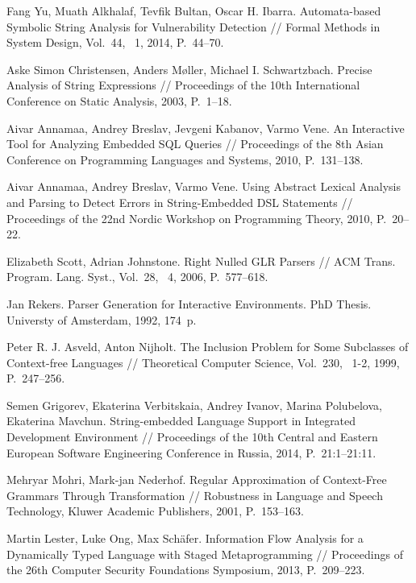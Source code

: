 \documentclass{llncs}
\begin{document}
%
%
\begin{thebibliography}{}
%
Fang Yu, Muath Alkhalaf, Tevfik Bultan, Oscar H. Ibarra.
Automata-based Symbolic String Analysis for Vulnerability Detection //
Formal Methods in System Design, Vol.~44, \textnumero~1, 2014, P.~44--70.

Aske Simon Christensen, Anders M{\o}ller, Michael I. Schwartzbach.
Precise Analysis of String Expressions //
Proceedings of the 10th International Conference on Static Analysis, 2003, P.~1--18.

Aivar Annamaa, Andrey Breslav, Jevgeni Kabanov, Varmo Vene.
An Interactive Tool for Analyzing Embedded SQL Queries //
Proceedings of the 8th Asian Conference on Programming Languages and Systems, 2010, P.~131--138.

Aivar Annamaa, Andrey Breslav, Varmo Vene. Using Abstract Lexical Analysis and Parsing to Detect 
Errors in String-Embedded DSL Statements // 
Proceedings of the 22nd Nordic Workshop on Programming Theory, 2010, P.~20--22. 

Elizabeth Scott, Adrian Johnstone.
Right Nulled GLR Parsers // ACM Trans. Program. Lang. Syst., Vol.~28, \textnumero~4,
2006, P.~577--618.

Jan Rekers.
Parser Generation for Interactive Environments. PhD Thesis. Universty of Amsterdam, 1992, 174~p.

Peter R. J. Asveld, Anton Nijholt.
The Inclusion Problem for Some Subclasses of Context-free Languages //
Theoretical Computer Science, Vol.~230, \textnumero~1-2, 1999, P.~247--256.

Semen Grigorev, Ekaterina Verbitskaia, Andrey Ivanov, Marina Polubelova, Ekaterina Mavchun.
String-embedded Language Support in Integrated Development Environment //
Proceedings of the 10th Central and Eastern European Software Engineering Conference in Russia, 2014, P.~21:1--21:11.

Mehryar Mohri, Mark-jan Nederhof.
Regular Approximation of Context-Free Grammars Through Transformation //
Robustness in Language and Speech Technology, Kluwer Academic Publishers, 2001, P.~153--163. 

Martin Lester, Luke Ong, Max Sch{\"{a}}fer.
Information Flow Analysis for a Dynamically Typed Language with Staged Metaprogramming //
Proceedings of the 26th Computer Security Foundations Symposium, 2013, P.~209--223.


\end{thebibliography}
\end{document}
